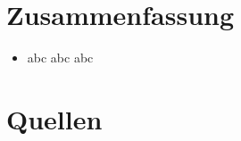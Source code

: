     \section{Zusammenfassung}
     \begin{itemize}
      \item abc abc abc
    \end{itemize}
    
    \section{Quellen}
    
    
    
    


